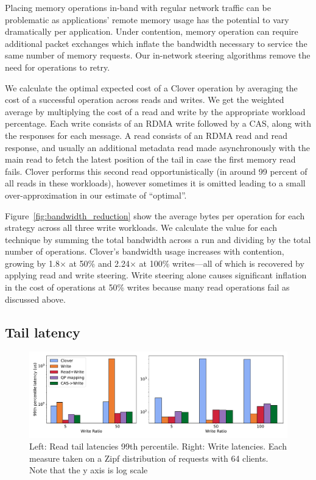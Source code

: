 Placing memory operations in-band with regular network traffic can be
problematic as applications' remote memory usage has the potential to
vary dramatically per application.  Under contention, memory operation
can require additional packet exchanges which inflate the bandwidth
necessary to service the same number of memory requests. Our
in-network steering algorithms remove the need for operations to
retry.


We calculate the optimal expected cost of a Clover operation by
averaging the cost of a successful operation across reads and
writes. We get the weighted average by multiplying the cost of a read
and write by the appropriate workload percentage. Each write consists
of an RDMA write followed by a CAS, along with the responses for each
message. A read consists of an RDMA read and read response, and
usually an additional metadata read made asynchronously with the main
read to fetch the latest position of the tail in case the first memory
read fails. Clover performs this second read opportunistically (in
around 99 percent of all reads in these workloads), however sometimes
it is omitted leading to a small over-approximation in our estimate of
``optimal''.

Figure~\ref{fig:bandwidth_reduction} show the average bytes per
operation for each strategy across all three write workloads. We
calculate the value for each technique by summing the total bandwidth
across a run and dividing by the total number of operations. Clover's
bandwidth usage increases with contention, growing by 1.8$\times$ at
50\% and 2.24$\times$ at 100\% writes---all of which is recovered by
applying read and write steering. Write steering alone causes
significant inflation in the cost of operations at 50\% writes because many
read operations fail as discussed above.

\subsection{Tail latency}

\begin{figure}
    \includegraphics[width=1.0\textwidth]{fig/99th_latency.pdf}

    \caption{Left: Read tail latencies 99th percentile. Right: Write latencies.
    Each measure taken on a Zipf distribution of requests with 64 clients. Note that the y axis is log scale}

    \label{fig:tail_latency}
\end{figure}


